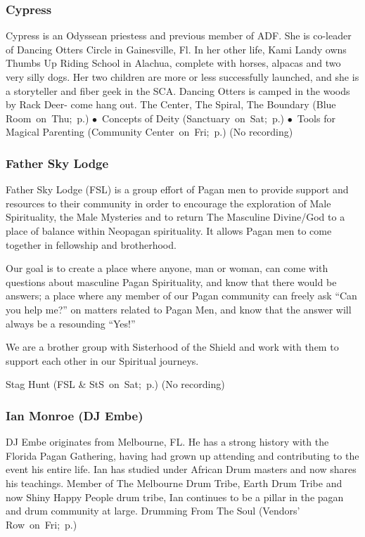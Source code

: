 \subsubsection{Cypress} %
{  \small  Cypress is an Odyssean priestess and previous member of ADF. She is co-leader of Dancing Otters Circle in Gainesville, Fl. In her other life, Kami Landy owns Thumbs Up Riding School in Alachua, complete with horses, alpacas and two very silly dogs. Her two children are more or less successfully launched, and she is a storyteller and fiber geek in the SCA. Dancing Otters is camped in the woods by Rack Deer- come hang out. } %
\hspace{2em} {\footnotesize The Center, The Spiral, The Boundary (Blue Room~on~Thu;~p.\pageref{Thu-Cypress1}) $\bullet$~Concepts of Deity (Sanctuary~on~Sat;~p.\pageref{Sat-Cypress3}) $\bullet$~Tools for Magical Parenting (Community Center~on~Fri;~p.\pageref{Fri-Cypress2})}
 {\small (No recording)} 

\vspace{6pt}

\subsubsection{Father Sky Lodge} %
{  \small  Father Sky Lodge (FSL) is a group effort of Pagan men to provide support and resources to their community in order to encourage the exploration of Male Spirituality, the Male Mysteries and to return The Masculine Divine/God to a place of balance within Neopagan spirituality. It allows Pagan men to come together in fellowship and brotherhood.

Our goal is to create a place where anyone, man or woman, can come with questions about masculine Pagan Spirituality, and know that there would be answers; a place where any member of our Pagan community can freely ask  ``Can you help me?''  on matters related to Pagan Men, and know that the answer will always be a resounding  ``Yes!'' 

We are a brother group with Sisterhood of the Shield and work with them to support each other in our Spiritual journeys. } %
\hspace{2em} {\footnotesize Stag Hunt (FSL \& StS~on~Sat;~p.\pageref{Sat-Stag})}
 {\small (No recording)} 

\vspace{6pt}

\subsubsection{Ian Monroe (DJ Embe)} %
{  \small  DJ Embe originates from Melbourne, FL. He has a strong history with the Florida Pagan Gathering, having had grown up attending and contributing to the event his entire life. Ian has studied under African Drum masters and now shares his teachings. Member of The Melbourne Drum Tribe, Earth Drum Tribe and now Shiny Happy People drum tribe, Ian continues to be a pillar in the pagan and drum community at large.  } %
\hspace{2em} {\footnotesize Drumming From The Soul (Vendors' Row~on~Fri;~p.\pageref{Fri-Embe1})}

